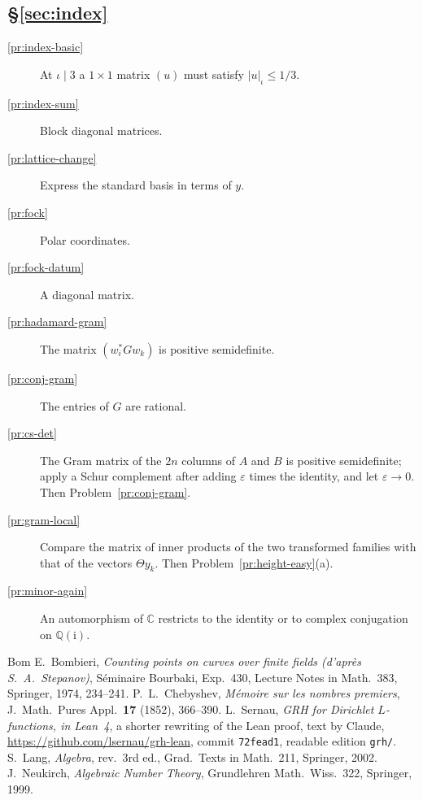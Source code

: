 \documentclass[reqno]{amsart}
\theoremstyle{definition}
\theoremstyle{plain}
\newcommand{\Q}{\mathbb{Q}}
\newcommand{\C}{\mathbb{C}}
\newcommand{\ii}{\mathrm{i}}
\begin{document}
\subsection*{\S\ref{sec:index}}
\begin{description}
\item[\ref{pr:index-basic}] At \(\iota \mid 3\) a \(1 \times 1\) matrix \((u)\) must satisfy \(\lvert u \rvert_\iota \le 1/3\).
\item[\ref{pr:index-sum}] Block diagonal matrices.
\item[\ref{pr:lattice-change}] Express the standard basis in terms of \(y\).
\item[\ref{pr:fock}] Polar coordinates.
\item[\ref{pr:fock-datum}] A diagonal matrix.
\item[\ref{pr:hadamard-gram}] The matrix \((w_i^* G w_k)\) is positive semidefinite.
\item[\ref{pr:conj-gram}] The entries of \(G\) are rational.
\item[\ref{pr:cs-det}] The Gram matrix of the \(2n\) columns of \(A\) and \(B\) is positive semidefinite; apply a Schur complement after adding \(\varepsilon\) times the identity, and let \(\varepsilon \to 0\).  Then Problem~\ref{pr:conj-gram}.
\item[\ref{pr:gram-local}] Compare the matrix of inner products of the two transformed families with that of the vectors \(\Theta y_k\).  Then Problem~\ref{pr:height-easy}(a).
\item[\ref{pr:minor-again}] An automorphism of \(\C\) restricts to the identity or to complex conjugation on \(\Q(\ii)\).
\end{description}

\begin{thebibliography}{Bom}
 E.~Bombieri, \emph{Counting points on curves over finite fields (d'apr\`es S.~A.~Stepanov)}, S\'eminaire Bourbaki, Exp.~430, Lecture Notes in Math.\ 383, Springer, 1974, 234--241.
 P.~L.~Chebyshev, \emph{M\'emoire sur les nombres premiers}, J.\ Math.\ Pures Appl.\ \textbf{17} (1852), 366--390.
 L.~Sernau, \emph{GRH for Dirichlet \(L\)-functions, in Lean~4}, a shorter rewriting of the Lean proof, text by Claude, \url{https://github.com/lsernau/grh-lean}, commit \texttt{72fead1}, readable edition \texttt{grh/}.
 S.~Lang, \emph{Algebra}, rev.\ 3rd ed., Grad.\ Texts in Math.\ 211, Springer, 2002.
 J.~Neukirch, \emph{Algebraic Number Theory}, Grundlehren Math.\ Wiss.\ 322, Springer, 1999.
\end{thebibliography}
\end{document}
